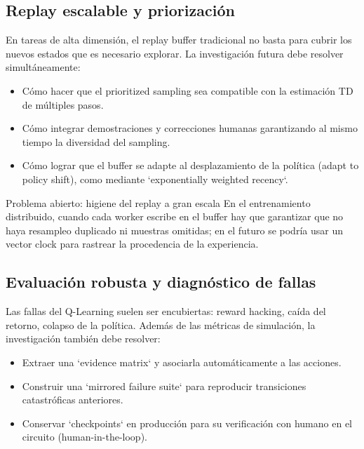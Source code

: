 \documentclass[a4paper]{article}
\begin{document}
\subsection{Replay escalable y priorización}

En tareas de alta dimensión, el replay buffer tradicional no basta para cubrir los nuevos estados que es necesario explorar. La investigación futura debe resolver simultáneamente:

\begin{itemize}
    \item Cómo hacer que el prioritized sampling sea compatible con la estimación TD de múltiples pasos.
    \item Cómo integrar demostraciones y correcciones humanas garantizando al mismo tiempo la diversidad del sampling.
    \item Cómo lograr que el buffer se adapte al desplazamiento de la política (adapt to policy shift), como mediante `exponentially weighted recency`.
\end{itemize}

\begin{importantbox}{Problema abierto: higiene del replay a gran escala}
En el entrenamiento distribuido, cuando cada worker escribe en el buffer hay que garantizar que no haya resampleo duplicado ni muestras omitidas; en el futuro se podría usar un vector clock para rastrear la procedencia de la experiencia.
\end{importantbox}

\subsection{Evaluación robusta y diagnóstico de fallas}

Las fallas del Q-Learning suelen ser encubiertas: reward hacking, caída del retorno, colapso de la política. Además de las métricas de simulación, la investigación también debe resolver:

\begin{itemize}
    \item Extraer una `evidence matrix` y asociarla automáticamente a las acciones.
    \item Construir una `mirrored failure suite` para reproducir transiciones catastróficas anteriores.
    \item Conservar `checkpoints` en producción para su verificación con humano en el circuito (human-in-the-loop).
\end{itemize}
\end{document}
